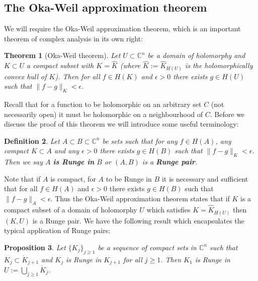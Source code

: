 \documentclass[11pt,a4paper, final, twoside]{article}
\newtheorem{theorem}{Theorem}
\newtheorem{definition}[theorem]{Definition}
\newtheorem{proposition}[theorem]{Proposition}
\numberwithin{equation}{section}
\newcommand{\C}{\mathbb C}
\newcommand{\inter}[1]{\mathring{#1}}
\newcommand{\hol}{H}
\begin{document}
\subsection{The Oka-Weil approximation theorem}
We will require the Oka-Weil approximation theorem, which is an important theorem of complex analysis in its own right:
\begin{theorem}[Oka-Weil theorem]
\label{okaweil}
Let $U\subset\C^n$ be a domain of holomorphy and $K\subset U$ a compact subset with $K=\hat K$ (where $\hat K:=\hat K_{\hol(U)}$ is the holomorphically convex hull of $K$). Then for all $f\in \hol(K)$ and
$\epsilon>0$ there exists $g\in \hol(U)$ such that $\|f-g\|_K<\epsilon$.
\end{theorem}
Recall that for a function to be holomorphic on an arbitrary set $C$ (not necessarily open) it must be holomorphic on a neighbourhood of $C$.
Before we discuss the proof of this theorem we will introduce some useful terminology:
\begin{definition}
Let $A\subset B\subset\C^n$ be sets such that for any $f\in\hol(A)$, any compact $K\subset A$ and any $\epsilon>0$ there exists $g\in\hol(B)$ such that $\|f-g\|_K<\epsilon$. Then
we say $A$ \textbf{is Runge in} $B$ or $(A,B)$ is a \textbf{Runge pair}.
\end{definition}
Note that if $A$ is compact, for $A$ to be Runge in $B$ it is necessary and sufficient that for all $f\in\hol(A)$ and $\epsilon>0$ there exists $g\in\hol(B)$ such that
$\|f-g\|_A<\epsilon$.
Thus the Oka-Weil approximation theorem states that if $K$ is a compact subset of a domain of holomorphy $U$ which satisfies $K=\hat K_{\hol(U)}$ then $(K,U)$ is a Runge pair. 
We have the following result which encapsulates the typical application of Runge pairs:
\begin{proposition}
\label{rungepair}
Let $\{K_j\}_{j\geq 1}$ be a sequence of compact sets in $\C^n$ such that $K_j\subset \inter K_{j+1}$ and $K_j$ is Runge in $K_{j+1}$ for all $j\geq 1$. 
Then $K_1$ is Runge in $U:=\bigcup_{j\geq 1}\inter K_j$.
\end{proposition}
\end{document}
